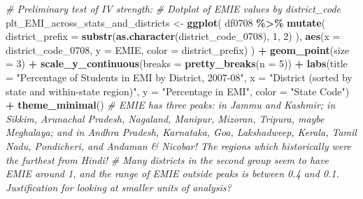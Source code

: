 \documentclass[
]{article}
\newenvironment{Shaded}{\begin{snugshade}}{\end{snugshade}}
\newcommand{\AttributeTok}[1]{\textcolor[rgb]{0.13,0.29,0.53}{#1}}
\newcommand{\CommentTok}[1]{\textcolor[rgb]{0.56,0.35,0.01}{\textit{#1}}}
\newcommand{\DecValTok}[1]{\textcolor[rgb]{0.00,0.00,0.81}{#1}}
\newcommand{\FunctionTok}[1]{\textcolor[rgb]{0.13,0.29,0.53}{\textbf{#1}}}
\newcommand{\NormalTok}[1]{#1}
\newcommand{\OtherTok}[1]{\textcolor[rgb]{0.56,0.35,0.01}{#1}}
\newcommand{\SpecialCharTok}[1]{\textcolor[rgb]{0.81,0.36,0.00}{\textbf{#1}}}
\newcommand{\StringTok}[1]{\textcolor[rgb]{0.31,0.60,0.02}{#1}}
\begin{document}
\begin{Shaded}
\begin{Highlighting}[]
\CommentTok{\# Preliminary test of IV strength:}
\CommentTok{\# Dotplot of EMIE values by district\_code}
\NormalTok{plt\_EMI\_across\_stats\_and\_districts }\OtherTok{\textless{}{-}} \FunctionTok{ggplot}\NormalTok{(}
\NormalTok{  df0708 }\SpecialCharTok{\%\textgreater{}\%} \FunctionTok{mutate}\NormalTok{(}
    \AttributeTok{district\_prefix =} \FunctionTok{substr}\NormalTok{(}\FunctionTok{as.character}\NormalTok{(district\_code\_0708), }\DecValTok{1}\NormalTok{, }\DecValTok{2}\NormalTok{)}
\NormalTok{    ), }
  \FunctionTok{aes}\NormalTok{(}\AttributeTok{x =}\NormalTok{ district\_code\_0708, }\AttributeTok{y =}\NormalTok{ EMIE, }\AttributeTok{color =}\NormalTok{ district\_prefix)}
\NormalTok{  ) }\SpecialCharTok{+}
  \FunctionTok{geom\_point}\NormalTok{(}\AttributeTok{size =} \DecValTok{3}\NormalTok{) }\SpecialCharTok{+}
  \FunctionTok{scale\_y\_continuous}\NormalTok{(}\AttributeTok{breaks =} \FunctionTok{pretty\_breaks}\NormalTok{(}\AttributeTok{n =} \DecValTok{5}\NormalTok{)) }\SpecialCharTok{+}
  \FunctionTok{labs}\NormalTok{(}\AttributeTok{title =} \StringTok{"Percentage of Students in EMI by District, 2007{-}08"}\NormalTok{,}
       \AttributeTok{x =} \StringTok{"District (sorted by state and within{-}state region)"}\NormalTok{, }\AttributeTok{y =} \StringTok{"Percentage in EMI"}\NormalTok{,}
       \AttributeTok{color =} \StringTok{"State Code"}\NormalTok{) }\SpecialCharTok{+}
  \FunctionTok{theme\_minimal}\NormalTok{()}
\CommentTok{\# EMIE has three peaks: in Jammu and Kashmir; in Sikkim, Arunachal Pradesh, Nagaland, Manipur, Mizoran, Tripura, maybe Meghalaya; and in Andhra Pradesh, Karnataka, Goa, Lakshadweep, Kerala, Tamil Nadu, Pondicheri, and Andaman \& Nicobar! The regions which historically were the furthest from Hindi!}
\CommentTok{\# Many districts in the second group seem to have EMIE around 1, and the range of EMIE outside peaks is between 0.4 and 0.1. Justification for looking at smaller units of analysis?}




\end{Highlighting}
\end{Shaded}
\end{document}
